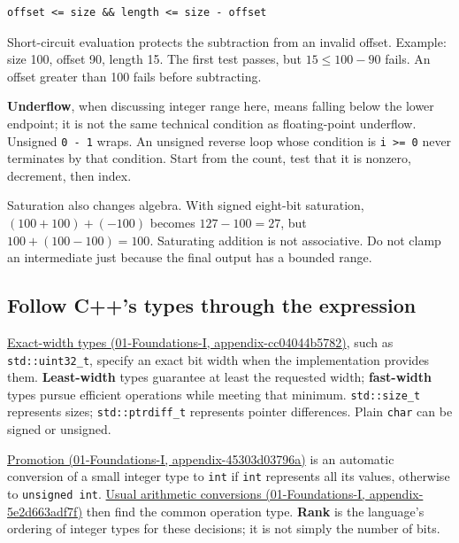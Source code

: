 \begin{verbatim}
offset <= size && length <= size - offset
\end{verbatim}

Short-circuit evaluation protects the subtraction from an invalid offset. Example: size 100, offset 90, length 15. The first test passes, but \(15\le 100-90\) fails. An offset greater than 100 fails before subtracting.

\textbf{Underflow}, when discussing integer range here, means falling below the lower endpoint; it is not the same technical condition as floating-point underflow. Unsigned \texttt{0\ -\ 1} wraps. An unsigned reverse loop whose condition is \texttt{i\ \textgreater{}=\ 0} never terminates by that condition. Start from the count, test that it is nonzero, decrement, then index.

Saturation also changes algebra. With signed eight-bit saturation, \((100+100)+(-100)\) becomes \(127-100=27\), but \(100+(100-100)=100\). Saturating addition is not associative. Do not clamp an intermediate just because the final output has a bounded range.

\subsection{Follow C++'s types through the expression}\label{05-engine-i-ch001-follow-cs-types-through-the-expression}

\href{../01-Foundations-I/main.pdf\#nameddest=appendix-cc04044b5782}{Exact-width types (01-Foundations-I, appendix-cc04044b5782)}, such as \texttt{std::uint32\_t}, specify an exact bit width when the implementation provides them. \textbf{Least-width} types guarantee at least the requested width; \textbf{fast-width} types pursue efficient operations while meeting that minimum. \texttt{std::size\_t} represents sizes; \texttt{std::ptrdiff\_t} represents pointer differences. Plain \texttt{char} can be signed or unsigned.

\href{../01-Foundations-I/main.pdf\#nameddest=appendix-45303d03796a}{Promotion (01-Foundations-I, appendix-45303d03796a)} is an automatic conversion of a small integer type to \texttt{int} if \texttt{int} represents all its values, otherwise to \texttt{unsigned\ int}. \href{../01-Foundations-I/main.pdf\#nameddest=appendix-5e2d663adf7f}{Usual arithmetic conversions (01-Foundations-I, appendix-5e2d663adf7f)} then find the common operation type. \textbf{Rank} is the language's ordering of integer types for these decisions; it is not simply the number of bits.

